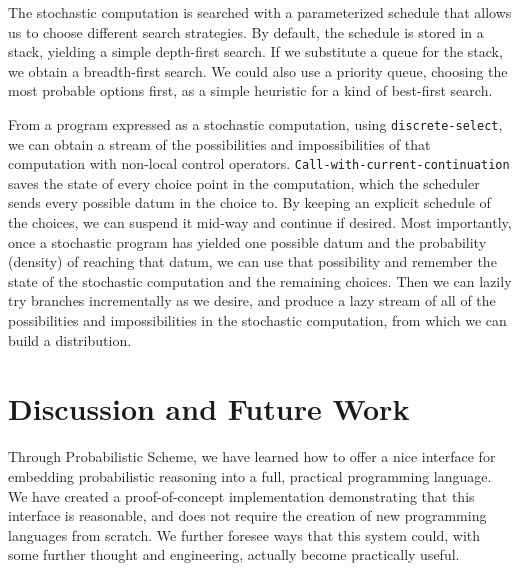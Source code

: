 \documentclass[12pt]{article}
\newcommand{\code}[1]{\texttt{#1}}
\begin{document}
The stochastic computation is searched with a parameterized schedule
 that allows us to choose different search strategies.
By default, the schedule is stored in a stack, yielding a simple
 depth-first search.
If we substitute a queue for the stack, we obtain a breadth-first
 search.
We could also use a priority queue, choosing the most probable options
 first, as a simple heuristic for a kind of best-first search.

From a program expressed as a stochastic computation, using
 \code{discrete-select}, we can obtain a stream of the possibilities
 and impossibilities of that computation with non-local control
 operators.
\code{Call-with-current-continuation} saves the state of every choice
 point in the computation, which the scheduler sends every possible
 datum in the choice to.
By keeping an explicit schedule of the choices, we can suspend it
 mid-way and continue if desired.
Most importantly, once a stochastic program has yielded one possible
 datum and the probability (density) of reaching that datum, we can
 use that possibility and remember the state of the stochastic
 computation and the remaining choices.
Then we can lazily try branches incrementally as we desire, and
 produce a lazy stream of all of the possibilities and impossibilities
 in the stochastic computation, from which we can build a
 distribution.

\section{Discussion and Future Work}
\label{discussion}

Through Probabilistic Scheme, we have learned how to offer a nice
interface for embedding probabilistic reasoning into a full, practical
programming language.  We have created a proof-of-concept
implementation demonstrating that this interface is reasonable, and
does not require the creation of new programming languages from
scratch.  We further foresee ways that this system could, with some
further thought and engineering, actually become practically useful.
\end{document}

